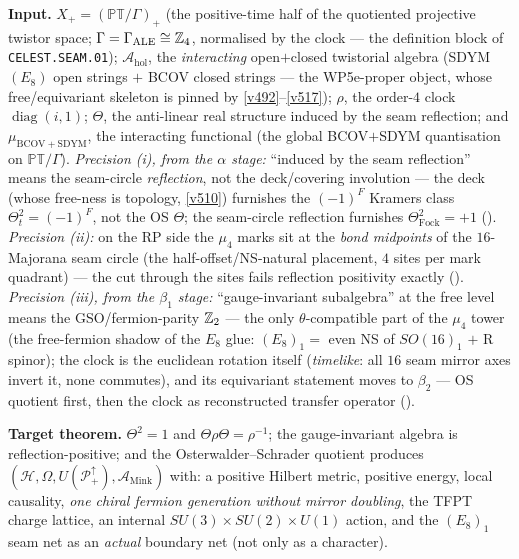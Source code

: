 \par\smallskip\noindent\textbf{Input.} $X_+=(\mathbb{PT}/\Gamma)_+$ (the positive-time half of the
quotiented projective twistor space; $\Gamma=\Gamma_{\mathrm{ALE}}\cong\mathbb Z_4$, normalised by the
clock --- the definition block of \texttt{CELEST.SEAM.01}); $\mathcal A_{\mathrm{hol}}$, the
\emph{interacting} open$+$closed twistorial algebra (SDYM$(E_8)$ open strings $+$ BCOV closed
strings --- the WP5e-proper object, whose free/equivariant skeleton is pinned by
\vref{v492}--\vref{v517}); $\rho$, the order-$4$ clock $\operatorname{diag}(i,1)$; $\Theta$, the
anti-linear real structure induced by the seam reflection; and $\mu_{\mathrm{BCOV+SDYM}}$, the
interacting functional (the global BCOV$+$SDYM quantisation on $\mathbb{PT}/\Gamma$).
\emph{Precision (i), from the $\alpha$ stage:} ``induced by the seam reflection'' means the
seam-circle \emph{reflection}, not the deck/covering involution --- the deck (whose free-ness is
topology, \vref{v510}) furnishes the $(-1)^F$ Kramers class $\Theta_t^2=(-1)^F$, not the OS
$\Theta$; the seam-circle reflection furnishes $\Theta_{\mathrm{Fock}}^2=+1$
().
\emph{Precision (ii):} on the RP side the $\mu_4$ marks sit at the \emph{bond midpoints} of the
$16$-Majorana seam circle (the half-offset/NS-natural placement, $4$ sites per mark quadrant) ---
the cut through the sites fails reflection positivity exactly
().
\emph{Precision (iii), from the $\beta_1$ stage:} ``gauge-invariant subalgebra'' at the free
level means the GSO/fermion-parity $\mathbb Z_2$ --- the only $\theta$-compatible part of the $\mu_4$
tower (the free-fermion shadow of the $E_8$ glue: $(E_8)_1=$ even NS of $SO(16)_1$ $+$ R
spinor); the clock is the euclidean rotation itself (\emph{timelike}: all $16$ seam mirror axes
invert it, none commutes), and its equivariant statement moves to $\beta_2$ --- OS quotient
first, then the clock as reconstructed transfer operator
().

\par\smallskip\noindent\textbf{Target theorem.} $\Theta^2=1$ and $\Theta\rho\Theta=\rho^{-1}$; the
gauge-invariant algebra is reflection-positive; and the Osterwalder--Schrader quotient produces
$(\mathcal H,\Omega,U(\mathcal P^\uparrow_+),\mathcal A_{\mathrm{Mink}})$ with: a positive Hilbert
metric, positive energy, local causality, \emph{one chiral fermion generation without mirror
doubling}, the TFPT charge lattice, an internal $SU(3){\times}SU(2){\times}U(1)$ action, and the
$(E_8)_1$ seam net as an \emph{actual} boundary net (not only as a character).


